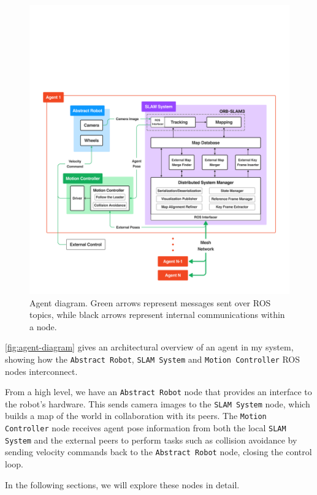\begin{figure}[h]
    \centering
    \includegraphics[trim=5cm 5cm 5cm 29cm, scale=0.2]{figures/agent_diagram.pdf}
    \caption{Agent diagram. Green arrows represent messages sent over ROS topics, while black arrows represent internal communications within a node.}
    \label{fig:agent-diagram}
\end{figure}

\autoref{fig:agent-diagram} gives an architectural overview of an agent in my system, showing how the \texttt{Abstract Robot}, \texttt{SLAM System} and \texttt{Motion Controller} ROS nodes interconnect.

From a high level, we have an \texttt{Abstract Robot} node that provides an interface to the robot's hardware. This sends camera images to the \texttt{SLAM System} node, which builds a map of the world in collaboration with its peers. The \texttt{Motion Controller} node receives agent pose information from both the local \texttt{SLAM System} and the external peers to perform tasks such as collision avoidance by sending velocity commands back to the \texttt{Abstract Robot} node, closing the control loop.

In the following sections, we will explore these nodes in detail.

